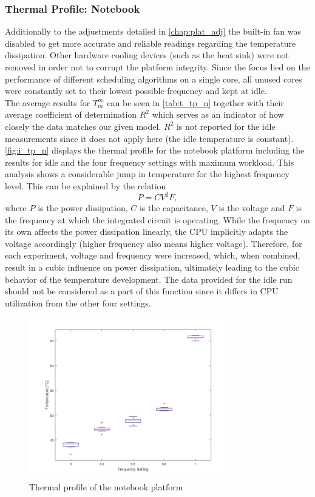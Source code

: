 \subsubsection{Thermal Profile: Notebook}
Additionally to the adjustments detailed in \ref{chap:plat_adj} the built-in fan was disabled to get more accurate and reliable readings regarding the temperature dissipation. Other hardware cooling devices (such as the heat sink) were not removed in order not to corrupt the platform integrity. Since the focus lied on the performance of different scheduling algorithms on a single core, all unused cores were constantly set to their lowest possible frequency and kept at idle.\\

The average results for $T^\infty_m$ can be seen in \autoref{tab:t_tp_n} together with their average coefficient of determination $R^2$ which serves as an indicator of how closely the data matches our given model. $R^2$ is not reported for the idle measurements since it does not apply here (the idle temperature is constant).\\
\hspace*{0.5ex}\hspace{0.5ex} \autoref{fig:i_tp_n} displays the thermal profile for the notebook platform including the results for idle and the four frequency settings with maximum workload. This analysis shows a considerable jump in temperature for the highest frequency level. This can be explained by the relation \cite{intel_formula} $$P = C V^2 F,$$ where \(P\) is the power dissipation, \(C\) is the capacitance, \(V\) is the voltage and \(F\) is the frequency at which the integrated circuit is operating. While the frequency on its own affects the power dissipation linearly, the CPU implicitly adapts the voltage accordingly (higher frequency also means higher voltage). Therefore, for each experiment, voltage and frequency were increased, which, when combined, result in a cubic influence on power dissipation, ultimately leading to the cubic behavior of the temperature development. The data provided for the idle run should not be considered as a part of this function since it differs in CPU utilization from the other four settings.
\begin{figure}[H]
  \centering
  \includegraphics[height=7cm]{figures/profile_notebook}
  \caption[Thermal Profile Notebook]{Thermal profile of the notebook platform}\label{fig:i_tp_n}
\end{figure}
